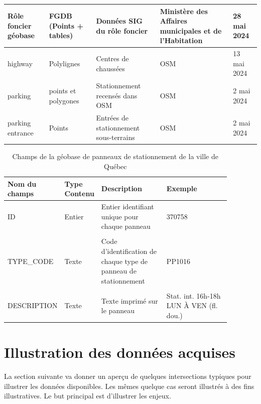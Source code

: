 \begin{landscape}
\begin{longtable}[h!]{p{.2 \linewidth} p{.1 \linewidth} p{.3 \linewidth} p{.15\linewidth} p{.125\linewidth} }
   \hline
   Rôle foncier géobase & FGDB (Points + tables) & Données SIG du rôle foncier & Ministère des Affaires municipales et de l'Habitation & 28 mai 2024 \\
   \hline
   highway & Polylignes & Centres de chaussées & \ac{OSM} & 13 mai 2024\\
   \hline
   parking & points et polygones & Stationnement recensés dans \ac{OSM} & \ac{OSM} & 2 mai 2024 \\
   \hline
    parking entrance & Points & Entrées de stationnement sous-terrains  & \ac{OSM} & 2 mai 2024 \\
    \hline
   
\end{longtable}

\begin{table}[h!]
  \centering
   \begin{tabular}{p{0.18\linewidth} | p{0.1\linewidth} | p{0.3\linewidth} | p{0.3\linewidth}} 
   \hline
   Nom du champs & Type Contenu & Description  & Exemple\\ 
   \hline
   ID             & Entier    & Entier identifiant unique pour chaque panneau  & 370758 \\ 
   & & & \\
   TYPE\_CODE      & Texte     & Code d'identification de chaque type de panneau de stationnement & PP1016\\
   & & & \\
   DESCRIPTION     & Texte     & Texte imprimé sur le panneau & Stat. int. 16h-18h LUN À VEN (fl. dou.)\\
   \hline
   \end{tabular}
   \caption{Champs de la géobase de panneaux de stationnement de la ville de Québec \parencite{VilledeQuebec:PanneauxSignalisation:2024}}
   \label{tab:champs_geobase_stationnement_quebec}
\end{table}
\end{landscape}

\section{Illustration des données acquises}
  La section suivante va donner un aperçu de quelques intersections typiques pour illustrer les données disponibles. Les mêmes quelque cas seront illustrés à des fins illustratives. Le but principal est d'illustrer les enjeux.

